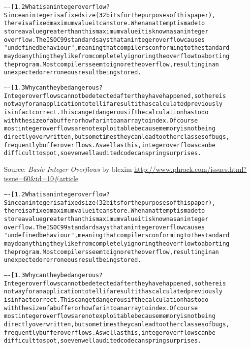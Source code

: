 \documentclass[Screen16to9,17pt]{foils}
\begin{document}
\begin{alltt}\footnotesize
----[ 1.2 What is an integer overflow?
Since an integer is a fixed size (32 bits for the purposes of this paper),
there is a fixed maximum value it can store.  When an attempt is made to
store a value greater than this maximum value it is known as an integer
overflow.  The ISO C99 standard says that an integer overflow causes
"undefined behaviour", meaning that compilers conforming to the standard
may do anything they like from completely ignoring the overflow to aborting
the program.  Most compilers seem to ignore the overflow, resulting in an
unexpected or erroneous result being stored.

----[ 1.3 Why can they be dangerous?
Integer overflows cannot be detected after they have happened, so there is
not way for an application to tell if a result it has calculated previously
is in fact correct.  This can get dangerous if the calculation has to do
with the size of a buffer or how far into an array to index.  Of course
most integer overflows are not exploitable because memory is not being
directly overwritten, but sometimes they can lead to other classes of bugs,
frequently buffer overflows.  As well as this, integer overflows can be
difficult to spot, so even well audited code can spring surprises.
\end{alltt}

Source:
\emph{Basic Integer Overflows} by blexim
\url{http://www.phrack.com/issues.html?issue=60&id=10#article}


\begin{alltt}\footnotesize
----[ 1.2 What is an integer overflow?
Since an integer is a fixed size (32 bits for the purposes of this paper),
there is a fixed maximum value it can store.  When an attempt is made to
store a value greater than this maximum value it is known as an integer
overflow.  The ISO C99 standard says that an integer overflow causes
"undefined behaviour", meaning that compilers conforming to the standard
may do anything they like from completely ignoring the overflow to aborting
the program.  Most compilers seem to ignore the overflow, resulting in an
unexpected or erroneous result being stored.

----[ 1.3 Why can they be dangerous?
Integer overflows cannot be detected after they have happened, so there is
not way for an application to tell if a result it has calculated previously
is in fact correct.  This can get dangerous if the calculation has to do
with the size of a buffer or how far into an array to index.  Of course
most integer overflows are not exploitable because memory is not being
directly overwritten, but sometimes they can lead to other classes of bugs,
frequently buffer overflows.  As well as this, integer overflows can be
difficult to spot, so even well audited code can spring surprises.
\end{alltt}
\end{document}
